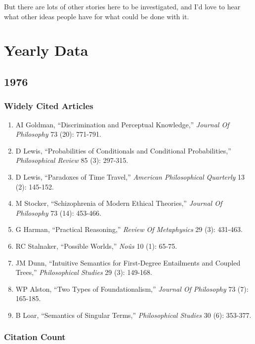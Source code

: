 \documentclass[
  10pt,
  letterpaper,
  DIV=11,
  numbers=noendperiod,
  twoside]{scrartcl}
\providecommand{\tightlist}{%
  \setlength{\itemsep}{0pt}\setlength{\parskip}{0pt}}\usepackage{longtable,booktabs,array}
\begin{document}
But there are lots of other stories here to be investigated, and I'd
love to hear what other ideas people have for what could be done with
it.

\section{Yearly Data}\label{yearly-data}

\subsection{1976}\label{sec-s1976}

\subsubsection*{Widely Cited Articles}\label{widely-cited-articles}

\begin{enumerate}
\def\labelenumi{\arabic{enumi}.}
\tightlist
\item
  AI Goldman, ``Discrimination and Perceptual Knowledge,'' \emph{Journal
  Of Philosophy} 73 (20): 771-791.
\item
  D Lewis, ``Probabilities of Conditionals and Conditional
  Probabilities,'' \emph{Philosophical Review} 85 (3): 297-315.
\item
  D Lewis, ``Paradoxes of Time Travel,'' \emph{American Philosophical
  Quarterly} 13 (2): 145-152.
\item
  M Stocker, ``Schizophrenia of Modern Ethical Theories,'' \emph{Journal
  Of Philosophy} 73 (14): 453-466.
\item
  G Harman, ``Practical Reasoning,'' \emph{Review Of Metaphysics} 29
  (3): 431-463.
\item
  RC Stalnaker, ``Possible Worlds,'' \emph{Noûs} 10 (1): 65-75.
\item
  JM Dunn, ``Intuitive Semantics for First-Degree Entailments and
  Coupled Trees,'' \emph{Philosophical Studies} 29 (3): 149-168.
\item
  WP Alston, ``Two Types of Foundationalism,'' \emph{Journal Of
  Philosophy} 73 (7): 165-185.
\item
  B Loar, ``Semantics of Singular Terms,'' \emph{Philosophical Studies}
  30 (6): 353-377.
\end{enumerate}

\subsubsection*{Citation Count}\label{sec-count-1976}
\end{document}
